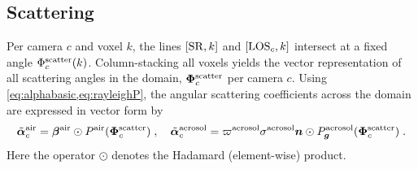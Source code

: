 \documentclass[10pt,letterpaper]{article}
\newcommand{\vect}[1]{\bm{#1}}
\newcommand{\OpDistance}{\bm{D}}
\newcommand{\DistUnknown}{\vect{n}}
\begin{document}
%
%
%


\subsection{Scattering}
\label{sec:scattering}

Per camera $c$ and voxel $k$, the lines $[{\rm SR},k]$ and $[{\rm
  LOS}_c,k]$ intersect at a fixed angle $\Phi^{\rm scatter}_c(k)$.
Column-stacking all voxels yields the vector representation of all
scattering angles in the domain, $\vect{\Phi}^{\rm scatter}_c$ per
camera $c$.
Using \cref{eq:alphabasic,eq:rayleighP}, the angular scattering
coefficients across the domain are expressed in vector form by
\begin{equation}
  \tilde{\vect{\alpha}}^{\rm air}_c =
  \vect{\beta}^{\rm air} \odot P^{\rm air}(\vect{\Phi}^{\rm scatter}_c)\;,
  \quad
  \tilde{\vect{\alpha}}^{\rm aerosol}_c =
  \varpi^{\rm aerosol} \sigma^{\rm aerosol}
  {\bm n} \odot P^{\rm aerosol}_{\bm g}(\vect{\Phi}^{\rm scatter}_c) \;.
  \label{eq:alpha_matrix}
\end{equation}
Here the operator $\odot$ denotes the Hadamard (element-wise) product.
\end{document}
